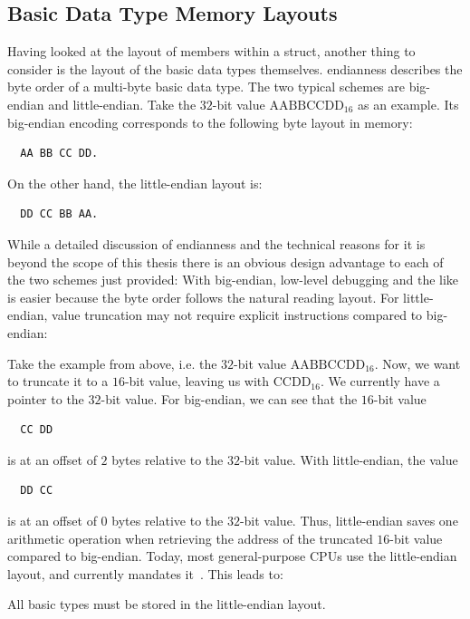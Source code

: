\subsection{Basic Data Type Memory Layouts}

Having looked at the layout of members within a struct, another thing to consider is the layout of the basic data types themselves. \Gls{endianness} describes the \gls{byte} order of a multi-\gls{byte} basic data type. The two typical schemes are \gls{big-endian} and \gls{little-endian}. Take the $32$-bit value $\mathrm{AABBCCDD}_{16}$ as an example. Its \gls{big-endian} encoding corresponds to the following \gls{byte} layout in memory:
\begin{lstlisting}
  AA BB CC DD.
\end{lstlisting}
On the other hand, the \gls{little-endian} layout is:
\begin{lstlisting}
  DD CC BB AA.
\end{lstlisting}

While a detailed discussion of \gls{endianness} and the technical reasons for it is beyond the scope of this thesis there is an obvious design advantage to each of the two schemes just provided: With \gls{big-endian}, low-level debugging and the like is easier because the \gls{byte} order follows the natural reading layout. For \gls{little-endian}, value truncation may not require explicit instructions compared to \gls{big-endian}:

Take the example from above, i.e. the $32$-bit value $\mathrm{AABBCCDD}_{16}$. Now, we want to truncate it to a $16$-bit value, leaving us with $\mathrm{CCDD}_{16}$. We currently have a pointer to the $32$-bit value. For \gls{big-endian}, we can see that the $16$-bit value
\begin{lstlisting}
  CC DD
\end{lstlisting}
is at an offset of $2$ \glspl{byte} relative to the $32$-bit value. With \gls{little-endian}, the value
\begin{lstlisting}
  DD CC
\end{lstlisting}
is at an offset of $0$ \glspl{byte} relative to the $32$-bit value. Thus, \gls{little-endian} saves one arithmetic operation when retrieving the address of the truncated $16$-bit value compared to \gls{big-endian}. Today, most general-purpose \glspl{CPU} use the \gls{little-endian} layout, and  currently mandates it~\cite{uefi-spec,ia32,arm-isa}. This leads to:

\begin{requirement}
  All basic types must be stored in the \gls{little-endian} layout.
\end{requirement}

